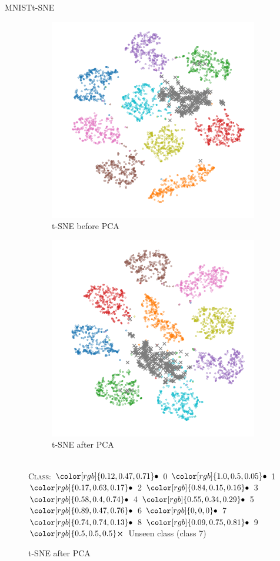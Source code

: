 \documentclass{beamer}
\newcommand{\legendBulletMNIST}{\footnotesize
		\centering
		\textsc{Class}:
		${\color[rgb]{0.12, 0.47, 0.71}\bullet}$ 0
		${\color[rgb]{1.0, 0.5, 0.05}\bullet}$ 1
		${\color[rgb]{0.17, 0.63, 0.17}\bullet}$ 2
		${\color[rgb]{0.84, 0.15, 0.16}\bullet}$ 3
		${\color[rgb]{0.58, 0.4, 0.74}\bullet}$ 4
		${\color[rgb]{0.55, 0.34, 0.29}\bullet}$ 5
		${\color[rgb]{0.89, 0.47, 0.76}\bullet}$ 6
		${\color[rgb]{0, 0, 0}\bullet}$ 7
		${\color[rgb]{0.74, 0.74, 0.13}\bullet}$ 8
		${\color[rgb]{0.09, 0.75, 0.81}\bullet}$ 9\\
		${\color[rgb]{0.5, 0.5, 0.5}\boldsymbol{\times}}$ Unseen class
}
\begin{document}
\begin{frame}{\gls{MNIST}}{\gls{t-SNE}}
	\begin{figure}[H]
		\centering
		\begin{subfigure}{.49\textwidth}
			\centering
			\includegraphics[width=\textwidth]{MNIST_t-SNE_wo_cl_7_before}
			\caption{\acrshort{t-SNE} before \acrshort{PCA}}
		\end{subfigure}
		\begin{subfigure}{.5\textwidth}
			\centering
			\includegraphics[width=\textwidth]{MNIST_t-SNE_wo_cl_7_after}
			\caption{\acrshort{t-SNE} after \acrshort{PCA}}
		\end{subfigure}
		\\[.2cm]
		\legendBulletMNIST (class 7)
		\label{fig:tsne-mnist}
	\end{figure}
\end{frame}
\end{document}
